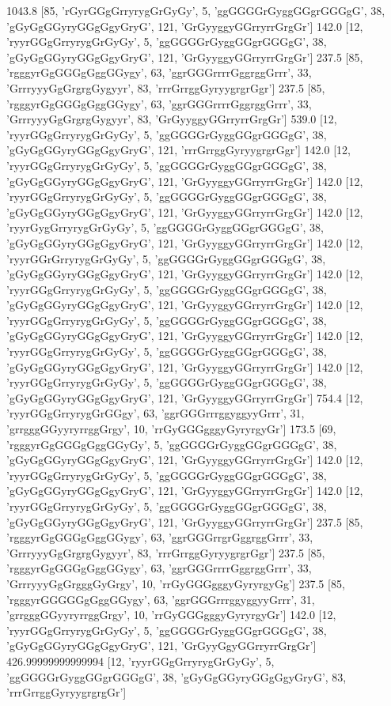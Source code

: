 1043.8 [85, 'rGyrGGgGrryrygGrGyGy', 5, 'ggGGGGrGyggGGgrGGGgG', 38, 'gGyGgGGyryGGgGgyGryG', 121, 'GrGyyggyGGrryrrGrgGr']
142.0 [12, 'ryyrGGgGrryrygGrGyGy', 5, 'ggGGGGrGyggGGgrGGGgG', 38, 'gGyGgGGyryGGgGgyGryG', 121, 'GrGyyggyGGrryrrGrgGr']
237.5 [85, 'rgggyrGgGGGgGggGGygy', 63, 'ggrGGGrrrrGggrggGrrr', 33, 'GrrryyyGgGrgrgGygyyr', 83, 'rrrGrrggGyryygrgrGgr']
237.5 [85, 'rgggyrGgGGGgGggGGygy', 63, 'ggrGGGrrrrGggrggGrrr', 33, 'GrrryyyGgGrgrgGygyyr', 83, 'GrGyyggyGGrryrrGrgGr']
539.0 [12, 'ryyrGGgGrryrygGrGyGy', 5, 'ggGGGGrGyggGGgrGGGgG', 38, 'gGyGgGGyryGGgGgyGryG', 121, 'rrrGrrggGyryygrgrGgr']
142.0 [12, 'ryyrGGgGrryrygGrGyGy', 5, 'ggGGGGrGyggGGgrGGGgG', 38, 'gGyGgGGyryGGgGgyGryG', 121, 'GrGyyggyGGrryrrGrgGr']
142.0 [12, 'ryyrGGgGrryrygGrGyGy', 5, 'ggGGGGrGyggGGgrGGGgG', 38, 'gGyGgGGyryGGgGgyGryG', 121, 'GrGyyggyGGrryrrGrgGr']
142.0 [12, 'ryyrGygGrryrygGrGyGy', 5, 'ggGGGGrGyggGGgrGGGgG', 38, 'gGyGgGGyryGGgGgyGryG', 121, 'GrGyyggyGGrryrrGrgGr']
142.0 [12, 'ryyrGGrGrryrygGrGyGy', 5, 'ggGGGGrGyggGGgrGGGgG', 38, 'gGyGgGGyryGGgGgyGryG', 121, 'GrGyyggyGGrryrrGrgGr']
142.0 [12, 'ryyrGGgGrryrygGrGyGy', 5, 'ggGGGGrGyggGGgrGGGgG', 38, 'gGyGgGGyryGGgGgyGryG', 121, 'GrGyyggyGGrryrrGrgGr']
142.0 [12, 'ryyrGGgGrryrygGrGyGy', 5, 'ggGGGGrGyggGGgrGGGgG', 38, 'gGyGgGGyryGGgGgyGryG', 121, 'GrGyyggyGGrryrrGrgGr']
142.0 [12, 'ryyrGGgGrryrygGrGyGy', 5, 'ggGGGGrGyggGGgrGGGgG', 38, 'gGyGgGGyryGGgGgyGryG', 121, 'GrGyyggyGGrryrrGrgGr']
142.0 [12, 'ryyrGGgGrryrygGrGyGy', 5, 'ggGGGGrGyggGGgrGGGgG', 38, 'gGyGgGGyryGGgGgyGryG', 121, 'GrGyyggyGGrryrrGrgGr']
754.4 [12, 'ryyrGGgGrryrygGrGGgy', 63, 'ggrGGGrrrggyggyyGrrr', 31, 'grrgggGGyyryrrggGrgy', 10, 'rrGyGGGgggyGyryrgyGr']
173.5 [69, 'rgggyrGgGGGgGggGGyGy', 5, 'ggGGGGrGyggGGgrGGGgG', 38, 'gGyGgGGyryGGgGgyGryG', 121, 'GrGyyggyGGrryrrGrgGr']
142.0 [12, 'ryyrGGgGrryrygGrGyGy', 5, 'ggGGGGrGyggGGgrGGGgG', 38, 'gGyGgGGyryGGgGgyGryG', 121, 'GrGyyggyGGrryrrGrgGr']
142.0 [12, 'ryyrGGgGrryrygGrGyGy', 5, 'ggGGGGrGyggGGgrGGGgG', 38, 'gGyGgGGyryGGgGgyGryG', 121, 'GrGyyggyGGrryrrGrgGr']
237.5 [85, 'rgggyrGgGGGgGggGGygy', 63, 'ggrGGGrrgrGggrggGrrr', 33, 'GrrryyyGgGrgrgGygyyr', 83, 'rrrGrrggGyryygrgrGgr']
237.5 [85, 'rgggyrGgGGGgGggGGygy', 63, 'ggrGGGrrrrGggrggGrrr', 33, 'GrrryyyGgGrgggGyGrgy', 10, 'rrGyGGGgggyGyryrgyGg']
237.5 [85, 'rgggyrGGGGGgGggGGygy', 63, 'ggrGGGrrrggyggyyGrrr', 31, 'grrgggGGyyryrrggGrgy', 10, 'rrGyGGGgggyGyryrgyGr']
142.0 [12, 'ryyrGGgGrryrygGrGyGy', 5, 'ggGGGGrGyggGGgrGGGgG', 38, 'gGyGgGGyryGGgGgyGryG', 121, 'GrGyyGgyGGrryrrGrgGr']
426.99999999999994 [12, 'ryyrGGgGrryrygGrGyGy', 5, 'ggGGGGrGyggGGgrGGGgG', 38, 'gGyGgGGyryGGgGgyGryG', 83, 'rrrGrrggGyryygrgrgGr']
